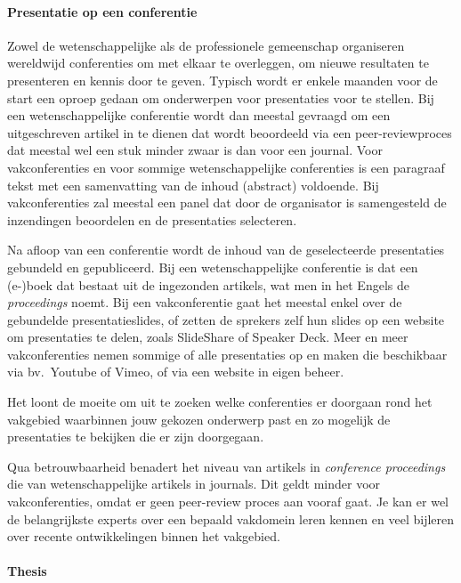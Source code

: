 \paragraph{Presentatie op een conferentie}

Zowel de wetenschappelijke als de professionele gemeenschap organiseren wereldwijd conferenties om met elkaar te overleggen, om nieuwe resultaten te presenteren en kennis door te geven. Typisch wordt er enkele maanden voor de start een oproep gedaan om onderwerpen voor presentaties voor te stellen. Bij een wetenschappelijke conferentie wordt dan meestal gevraagd om een uitgeschreven artikel in te dienen dat wordt beoordeeld via een peer-reviewproces dat meestal wel een stuk minder zwaar is dan voor een journal. Voor vakconferenties en voor sommige wetenschappelijke conferenties is een paragraaf tekst met een samenvatting van de inhoud (abstract) voldoende. Bij vakconferenties zal meestal een panel dat door de organisator is samengesteld de inzendingen beoordelen en de presentaties selecteren.

Na afloop van een conferentie wordt de inhoud van de geselecteerde presentaties gebundeld en gepubliceerd. Bij een wetenschappelijke conferentie is dat een (e-)boek dat bestaat uit de ingezonden artikels, wat men in het Engels de \emph{proceedings} noemt. Bij een vakconferentie gaat het meestal enkel over de gebundelde presentatieslides, of zetten de sprekers zelf hun slides op een website om presentaties te delen, zoals SlideShare of Speaker Deck. Meer en meer vakconferenties nemen sommige of alle presentaties op en maken die beschikbaar via bv.~Youtube of Vimeo, of via een website in eigen beheer.

Het loont de moeite om uit te zoeken welke conferenties er doorgaan rond het vakgebied waarbinnen jouw gekozen onderwerp past en zo mogelijk de presentaties te bekijken die er zijn doorgegaan.

Qua betrouwbaarheid benadert het niveau van artikels in \emph{conference proceedings} die van wetenschappelijke artikels in journals. Dit geldt minder voor vakconferenties, omdat er geen peer-review proces aan vooraf gaat. Je kan er wel de belangrijkste experts over een bepaald vakdomein leren kennen en veel bijleren over recente ontwikkelingen binnen het vakgebied.

\paragraph{Thesis}

